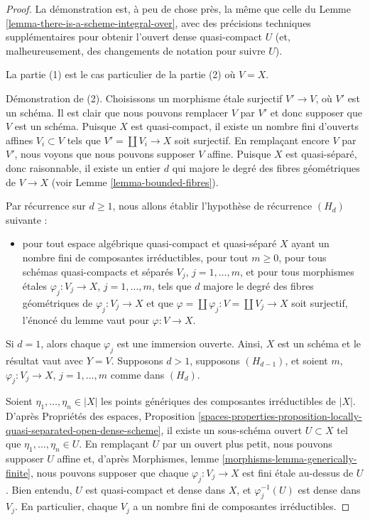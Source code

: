 \begin{proof}
La démonstration est, à peu de chose près, la même que celle du
Lemme \ref{lemma-there-is-a-scheme-integral-over}, avec des précisions
techniques supplémentaires pour obtenir l'ouvert dense quasi-compact $U$
(et, malheureusement, des changements de notation pour suivre $U$).

\medskip\noindent
La partie (1) est le cas particulier de la partie (2) où $V = X$.

\medskip\noindent
Démonstration de (2). Choisissons un morphisme étale surjectif $V' \to V$,
où $V'$ est un schéma. Il est clair que nous pouvons remplacer $V$ par $V'$
et donc supposer que $V$ est un schéma. Puisque $X$ est quasi-compact, il
existe un nombre fini d'ouverts affines $V_i \subset V$ tels que
$V' = \coprod V_i \to X$ soit surjectif. En remplaçant encore $V$ par $V'$,
nous voyons que nous pouvons supposer $V$ affine. Puisque $X$ est
quasi-séparé, donc raisonnable, il existe un entier $d$ qui majore le degré
des fibres géométriques de $V \to X$
(voir Lemme \ref{lemma-bounded-fibres}).

\medskip\noindent
Par récurrence sur $d \geq 1$, nous allons établir l'hypothèse de récurrence
$(H_d)$ suivante :
\begin{itemize}
\item pour tout espace algébrique quasi-compact et quasi-séparé $X$ ayant
un nombre fini de composantes irréductibles, pour tout $m \geq 0$, pour tous
schémas quasi-compacts et séparés $V_j$, $j = 1, \ldots, m$, et pour tous
morphismes étales $\varphi_j : V_j \to X$, $j = 1, \ldots, m$, tels que $d$
majore le degré des fibres géométriques de $\varphi_j : V_j\to X$ et que
$\varphi = \coprod \varphi_j : V = \coprod V_j \to X$ soit surjectif,
l'énoncé du lemme vaut pour $\varphi : V \to X$.
\end{itemize}
Si $d = 1$, alors chaque $\varphi_j$ est une immersion ouverte. Ainsi, $X$
est un schéma et le résultat vaut avec $Y = V$.
Supposons $d > 1$, supposons $(H_{d - 1})$, et soient
$m$, $\varphi_j : V_j \to X$, $j = 1, \ldots, m$ comme dans $(H_d)$.

\medskip\noindent
Soient $\eta_1, \ldots, \eta_n \in |X|$ les points génériques des
composantes irréductibles de $|X|$. D'après
Propriétés des espaces, Proposition
\ref{spaces-properties-proposition-locally-quasi-separated-open-dense-scheme},
il existe un sous-schéma ouvert $U \subset X$ tel que
$\eta_1, \ldots, \eta_n \in U$. En remplaçant $U$ par un ouvert plus petit,
nous pouvons supposer $U$ affine et, d'après
Morphismes, lemme \ref{morphisms-lemma-generically-finite},
nous pouvons supposer que chaque $\varphi_j : V_j \to X$ est fini étale
au-dessus de $U$. Bien entendu, $U$ est quasi-compact et dense dans $X$,
et $\varphi_j^{-1}(U)$ est dense dans $V_j$. En particulier, chaque $V_j$
a un nombre fini de composantes irréductibles.


\end{proof}
